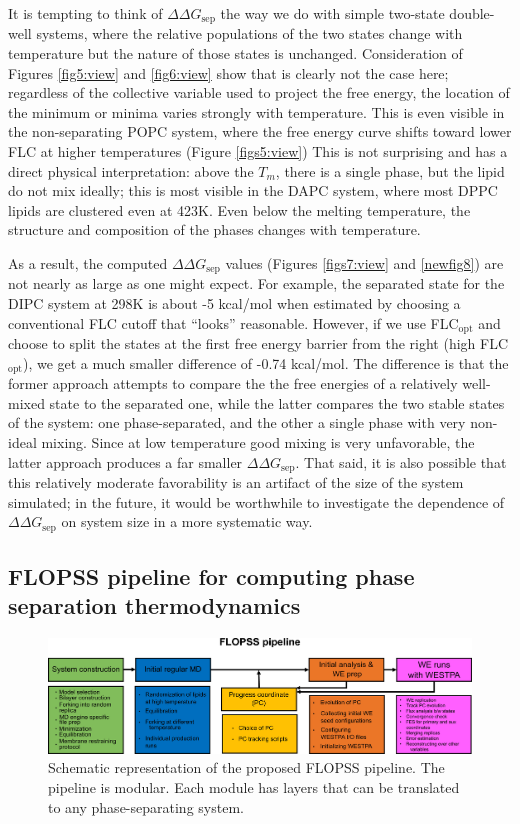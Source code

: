 \documentclass{biophys-new}
\begin{document}
It is tempting to think of $\Delta \Delta G_{\text{sep}}$ the way we do with simple two-state double-well systems, where the relative populations of the two states change with temperature but the nature of those states is unchanged. Consideration of Figures \ref{fig5:view} and \ref{fig6:view} show that is clearly not the case here; regardless of the collective variable used to project the free energy, the location of the minimum or minima varies strongly with temperature. This is even visible in the non-separating POPC system, where the free energy curve shifts toward lower FLC at higher temperatures (Figure \ref{figs5:view}) This is not surprising and has a direct physical interpretation: above the $T_m$, there is a single phase, but the lipid do not mix ideally; this is most visible in the DAPC system, where most DPPC lipids are clustered even at 423K. Even below the melting temperature, the structure and composition of the phases changes with temperature. 

As a result, the computed $\Delta \Delta G_{\text{sep}}$ values (Figures \ref{figs7:view} and \ref{newfig8}) are not nearly as large as one might expect. For example, the separated state for the DIPC system at 298K is about -5 kcal/mol when estimated by choosing a conventional FLC cutoff that ``looks'' reasonable. However, if we use FLC$_{\text{opt}}$ and choose to split the states at the first free energy barrier from the right (high FLC$_{\text{opt}}$), we get a much smaller difference of -0.74 kcal/mol.  The difference is that the former approach attempts to compare the the free energies of a relatively well-mixed state to the separated one, while the latter compares the two stable states of the system: one phase-separated, and the other a single phase with very non-ideal mixing. Since at low temperature good mixing is very unfavorable, the latter approach produces a far smaller $\Delta \Delta G_{\text{sep}}$.  That said, it is also possible that this relatively moderate favorability is an artifact of the size of the system simulated; in the future, it would be worthwhile to investigate the dependence of $\Delta \Delta G_{\text{sep}}$ on system size in a more systematic way.


\subsection*{FLOPSS pipeline for computing phase separation thermodynamics}

\begin{figure}[hbt!]
\centering
\includegraphics[width=6.5in]{Figures/Main/8/placeholder.jpg}
\caption{Schematic representation of the proposed FLOPSS pipeline. The pipeline is modular. Each module has layers that can be translated to any phase-separating system.}
\label{figs8:view}
\end{figure}
\end{document}
